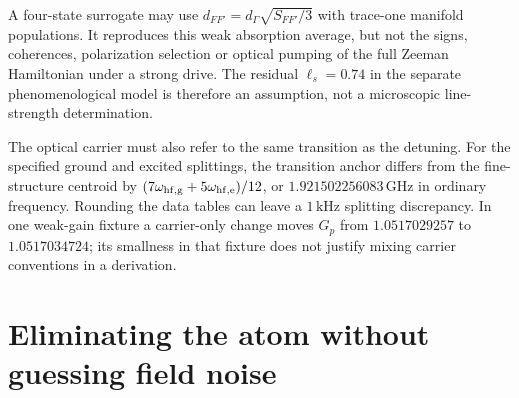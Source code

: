 \documentclass[11pt,a4paper]{article}
\newcommand{\GHz}{\,\mathrm{GHz}}
\newcommand{\kHz}{\,\mathrm{kHz}}
\begin{document}
A four-state surrogate may use $d_{FF'}=d_\Gamma\sqrt{S_{FF'}/3}$ with
trace-one manifold populations. It reproduces this weak absorption average,
but not the signs, coherences, polarization selection or optical pumping of
the full Zeeman Hamiltonian under a strong drive. The residual $\ell_s=0.74$
in the separate phenomenological model is therefore an assumption, not a
microscopic line-strength determination.

The optical carrier must also refer to the same transition as the detuning.
For the specified ground and excited splittings, the transition anchor differs
from the fine-structure centroid by
$(7\omega_{\rm hf,g}+5\omega_{\rm hf,e})/12$, or
$1.921502256083\GHz$ in ordinary frequency. Rounding the data tables can
leave a $1\kHz$ splitting discrepancy. In one weak-gain fixture a carrier-only
change moves $G_p$ from $1.0517029257$ to $1.0517034724$; its smallness in that
fixture does not justify mixing carrier conventions in a derivation.

\section{Eliminating the atom without guessing field noise}
\label{sec:gc-field}
\end{document}

